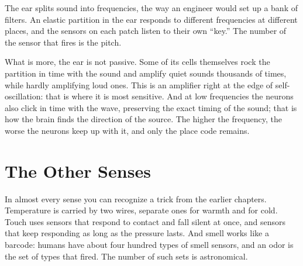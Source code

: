The ear splits sound into frequencies, the way an engineer would set up a bank of filters. An elastic partition in the ear responds to different frequencies at different places, and the sensors on each patch listen to their own ``key.'' The number of the sensor that fires is the pitch.


What is more, the ear is not passive. Some of its cells themselves rock the partition in time with the sound and amplify quiet sounds thousands of times, while hardly amplifying loud ones. This is an amplifier right at the edge of self-oscillation: that is where it is most sensitive. And at low frequencies the neurons also click in time with the wave, preserving the exact timing of the sound; that is how the brain finds the direction of the source. The higher the frequency, the worse the neurons keep up with it, and only the place code remains.

\section*{The Other Senses}

In almost every sense you can recognize a trick from the earlier chapters. Temperature is carried by two wires, separate ones for warmth and for cold. Touch uses sensors that respond to contact and fall silent at once, and sensors that keep responding as long as the pressure lasts. And smell works like a barcode: humans have about four hundred types of smell sensors, and an odor is the set of types that fired. The number of such sets is astronomical.

